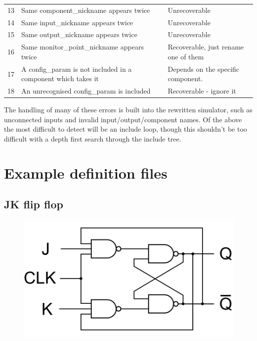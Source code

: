 \documentclass[a4paper]{article}
\begin{document}
\begin{table}[h]
\begin{tabular}{p{0.5cm}p{8cm}p{4cm}}
                13     & Same component\_nickname appears twice                                   & Unrecoverable                                        \\
                14     & Same input\_nickname appears twice                                       & Unrecoverable                                        \\
                15     & Same output\_nickname appears twice                                      & Unrecoverable                                        \\
                16     & Same monitor\_point\_nickname appears twice                              & Recoverable, just rename one of them                 \\
                17     & A config\_param is not included in a component which takes it            & Depends on the specific component.                   \\
                18     & An unrecognised config\_param is included                                & Recoverable - ignore it                              \\ \bottomrule
            \end{tabular}
        \end{table}

        The handling of many of these errors is built into the rewritten simulator, such as unconnected inputs and invalid input/output/component names. Of the above the most difficult to detect will be an include loop, though this shouldn't be too difficult with a depth first search through the include tree.

\section{Example definition files}
    \subsection{JK flip flop}
        

        \begin{figure}
            \centering
            \includegraphics[width=.7\textwidth]{images/jkflipflop_schematic}
        \end{figure}
\end{document}
